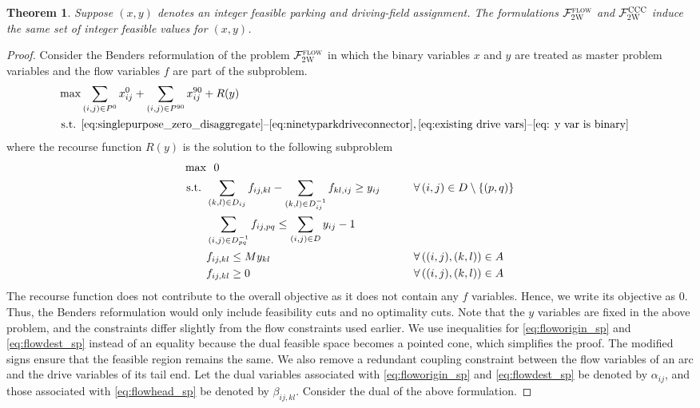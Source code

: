 \documentclass[10pt]{article}
\newcommand{\zeroparkvar}[2]{x^{0}_{#1#2}}
\newcommand{\ninetyparkvar}[2]{x^{90}_{#1#2}}
\newcommand{\drivevar}[2]{y_{#1#2}}
\newcommand{\flowvar}[4]{f_{#1#2,#3#4}}
\newcommand{\validzeroparkset}{P^{0}}
\newcommand{\validninetyparkset}{P^{90}}
\newcommand{\validdriveset}{D}
\newcommand{\gridadjset}[2]{D_{#1#2}}
\newcommand{\gridinvadjset}[2]{D^{-1}_{#1#2}}
\newcommand{\gridarcset}{A}
\newcommand{\entrancex}{p}
\newcommand{\entrancey}{q}
\newtheorem{theorem}{Theorem}
\theoremstyle{definition}
\begin{document}
\begin{theorem}
\label{theorem:two_way}
Suppose $(x, y)$ denotes an integer feasible parking and driving-field assignment. The formulations $\mathcal{F}_{\textsc{2W}}^{\textsc{flow}}$ and $\mathcal{F}_{\textsc{2W}}^{\textsc{CCC}}$ induce the same set of integer feasible values for $(x,y)$.
\end{theorem} 
\begin{proof}
Consider the Benders reformulation of the problem $\mathcal{F}^{\textsc{flow}}_{\textsc{2W}}$ in which the binary variables $x$ and $y$ are treated as master problem variables and the flow variables $f$ are part of the subproblem. 
\begin{align}
    \max & \sum_{(i,j) \in \validzeroparkset} \zeroparkvar{i}{j} + \sum_{(i,j) \in \validninetyparkset} \ninetyparkvar{i}{j} + R(y)  && \\
     \text{s.t. } &  \eqref{eq:singlepurpose_zero_disaggregate} \text{--}\eqref{eq:ninetyparkdriveconnector}, \eqref{eq:existing drive vars} \text{--} \eqref{eq: y var is binary}  \notag 
\end{align}
where the recourse function $R(y)$ is the solution to the following subproblem 
\begin{align}
    \max & \, \, \, \, 0  && \notag \\
    \text{s.t. } & \sum_{(k,l) \in \gridadjset{i}{j}} \flowvar{i}{j}{k}{l} - \sum_{(k,l) \in \gridinvadjset{i}{j}} \flowvar{k}{l}{i}{j} \geq \drivevar{i}{j} \qquad && \forall \, (i,j) \in \validdriveset \setminus \{(\entrancex, \entrancey)\} \label{eq:floworigin_sp}\\
     & \sum_{(i,j) \in \gridinvadjset{\entrancex}{\entrancey}} \flowvar{i}{j}{\entrancex}{\entrancey} \leq \sum_{(i,j) \in \validdriveset} \drivevar{i}{j} -1 \qquad &&  \label{eq:flowdest_sp}\\
    & \flowvar{i}{j}{k}{l} \leq M \drivevar{k}{l} \qquad && \forall \, ((i,j), (k,l)) \in \gridarcset \label{eq:flowhead_sp} \\
    & \flowvar{i}{j}{k}{l} \geq 0 \qquad && \forall \, ((i,j), (k,l)) \label{eq:flow var is continuous non negative_sp}\in \gridarcset
\end{align}
The recourse function does not contribute to the overall objective as it does not contain any $f$ variables. Hence, we write its objective as 0. Thus, the Benders reformulation would only include feasibility cuts and no optimality cuts. Note that the $y$ variables are fixed in the above problem, and the constraints differ slightly from the flow constraints used earlier. We use inequalities for \eqref{eq:floworigin_sp} and \eqref{eq:flowdest_sp} instead of an equality because the dual feasible space becomes a pointed cone, which simplifies the proof. The modified signs ensure that the feasible region remains the same. We also remove a redundant coupling constraint between the flow variables of an arc and the drive variables of its tail end. Let the dual variables associated with \eqref{eq:floworigin_sp} and \eqref{eq:flowdest_sp} be denoted by $\alpha_{ij}$, and those associated with \eqref{eq:flowhead_sp} be denoted by $\beta_{ij, kl}$. Consider the dual of the above formulation.

\end{proof}
\end{document}
